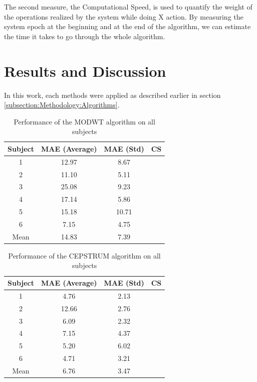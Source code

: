 \documentclass[twoside,twocolumn]{article}
\begin{document}
	The second measure, the Computational Speed, is used to quantify the weight of the operations realized by the system while doing X action. By measuring the system epoch at the beginning and at the end of the algorithm, we can estimate the time it takes to go through the whole algorithm.

\section{Results and Discussion}
\label{section:RD}
	In this work, each methods were applied as described earlier in section \ref{subsection:Methodology:Algorithms}. 
	
	
		\begin{table}[ht]
		\centering
		 \begin{tabular}{cccc} 
		 \hline
		 Subject & MAE (Average) & MAE (Std) & CS \\ [0.5ex] 
		 \hline\hline
		 1 & 12.97 & 8.67 &  \\
		 \hline
		 2 & 11.10 & 5.11 &  \\
		 \hline
		 3 & 25.08 & 9.23 &  \\
		 \hline
		 4 & 17.14 & 5.86 &  \\
		 \hline
		 5 & 15.18 & 10.71 &  \\
		 \hline
		 6 & 7.15 & 4.75 &  \\
		 \hline
		 Mean  & 14.83 & 7.39 &  \\
		 \hline
		\end{tabular}
		\label{table:performance_results}
		\caption{Performance of the MODWT algorithm on all subjects}
		\end{table}
		
		\begin{table}[ht]
		\centering
		 \begin{tabular}{cccc} 
		 \hline
		 Subject & MAE (Average) & MAE (Std) & CS \\ [0.5ex] 
		 \hline\hline
		 1 & 4.76 & 2.13 &  \\
		 \hline
		 2 & 12.66 & 2.76 &  \\
		 \hline
		 3 & 6.09 & 2.32 &  \\
		 \hline
		 4 & 7.15 & 4.37 &  \\
		 \hline
		 5 & 5.20 & 6.02 &  \\
		 \hline
		 6 & 4.71 & 3.21 &  \\
		 \hline
		 Mean  & 6.76 & 3.47 &  \\
		 \hline
		\end{tabular}
		\label{table:performance_results}
		\caption{Performance of the CEPSTRUM algorithm on all subjects}
		\end{table}
		
\end{document}
